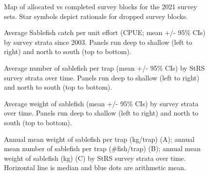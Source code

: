 \documentclass[12pt]{article}\usepackage[]{graphicx}\usepackage[]{color}
\begin{document}
\begin{figure}[htb]

{\centering {} 

}

\caption{Map of allocated vs completed survey blocks for the 2021 survey sets. Star symbols depict rationale for dropped survey blocks.}\label{fig:figure6}
\end{figure}
\clearpage

\clearpage


\begin{figure}[htb]

{\centering {} 

}

\caption{Average Sablefish catch per unit effort (CPUE; mean +/- 95\% CIs) by survey strata since 2003. Panels run deep to shallow (left to right) and north to south (top to bottom).}\label{fig:figure7}
\end{figure}
\clearpage


\begin{figure}[htb]

{\centering {} 

}

\caption{Average number of sablefish per trap (mean +/- 95\% CIs) by StRS survey strata over time. Panels run deep to shallow (left to right) and north to south (top to bottom).}\label{fig:figure8}
\end{figure}
\clearpage


\begin{figure}[htb]

{\centering {} 

}

\caption{Average weight of sablefish (mean +/- 95\% CIs) by survey strata over time. Panels run deep to shallow (left to right) and north to south (top to bottom).}\label{fig:figure9}
\end{figure}
\clearpage


\begin{figure}[htb]

{\centering {} 

}

\caption{Annual mean weight of sablefish per trap (kg/trap) (A); annual mean number of sablefish per trap (\#fish/trap) (B); annual mean weight of sablefish (kg) (C) by StRS survey strata over time. Horizontal line is median and blue dots are arithmetic mean.}\label{fig:figure10}
\end{figure}
\clearpage
\end{document}
